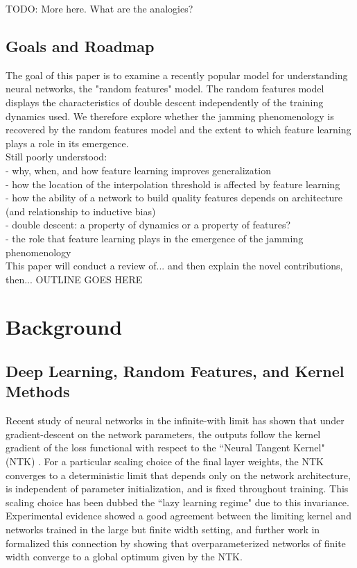 \documentclass[a4paper, 12pt]{article}
\begin{document}
TODO: More here. What are the analogies? 

\subsection{Goals and Roadmap}

The goal of this paper is to examine a recently popular model for understanding neural networks, the "random features" model. The random features model displays the characteristics of double descent independently of the training dynamics used. We therefore explore whether the jamming phenomenology is recovered by the random features model and the extent to which feature learning plays a role in its emergence.\\


Still poorly understood:\\
- why, when, and how feature learning improves generalization\\
- how the location of the interpolation threshold is affected by feature learning\\
- how the ability of a network to build quality features depends on architecture (and relationship to inductive bias) \\
- double descent: a property of dynamics or a property of features?\\
- the role that feature learning plays in the emergence of the jamming phenomenology\\

This paper will conduct a review of... and then explain the novel contributions, then... OUTLINE GOES HERE

\section{Background}
\subsection{Deep Learning, Random Features, and Kernel Methods}

Recent study of neural networks in the infinite-with limit has shown that under gradient-descent on the network parameters, the outputs follow the kernel gradient of the loss functional with respect to the ``Neural Tangent Kernel" (NTK) \cite{jacotNeuralTangentKernel2018}. For a particular scaling choice of the final layer weights, the NTK converges to a deterministic limit that depends only on the network architecture, is independent of parameter initialization, and is fixed throughout training. This scaling choice has been dubbed the ``lazy learning regime" due to this invariance. Experimental evidence showed a good agreement between the limiting kernel and networks trained in the large but finite width setting, and further work in \cite{allen-zhuConvergenceTheoryDeep2019} formalized this connection by showing that overparameterized networks of finite width converge to a global optimum given by the NTK.\\
\end{document}
